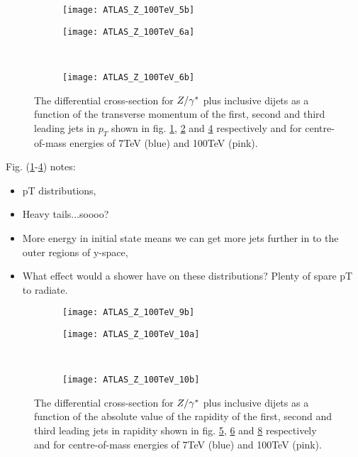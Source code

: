 	\begin{figure}[h]
		\centering
		\begin{subfigure}[b]{0.48\textwidth}
			\texttt{[image: ATLAS\_Z\_100TeV\_5b]}
			\caption{}
			\label{fig:100tev_5b}
		\end{subfigure}

		\begin{subfigure}[b]{0.48\textwidth}
			\texttt{[image: ATLAS\_Z\_100TeV\_6a]}
			\caption{}
			\label{fig:100tev_6a}
		\end{subfigure}
		~
		\begin{subfigure}[b]{0.48\textwidth}
			\texttt{[image: ATLAS\_Z\_100TeV\_6b]}
			\caption{}
			\label{fig:100tev_6b}
		\end{subfigure}
		\caption{The differential cross-section for $Z/\gamma^*$ plus inclusive dijets as a function of the transverse momentum
		         of the first, second and third leading jets in $p_T$ shown in fig. \ref{fig:100tev_5b}, \ref{fig:100tev_6a}
		         and \ref{fig:100tev_6b} respectively and for centre-of-mass energies of 7TeV (blue) and 100TeV (pink).}
	\end{figure}

	Fig. (\ref{fig:100tev_5b}-\ref{fig:100tev_6b}) notes:

	\begin{itemize}
		\item pT distributions,
		\item Heavy tails...soooo?
		\item More energy in initial state means we can get more jets further in to the outer regions of y-space,
		\item What effect would a shower have on these distributions?  Plenty of spare pT to radiate.
	\end{itemize}

	\begin{figure}[h]
		\centering
		\begin{subfigure}[b]{0.48\textwidth}
			\texttt{[image: ATLAS\_Z\_100TeV\_9b]}
			\caption{}
			\label{fig:100tev_9b}
		\end{subfigure}

		\begin{subfigure}[b]{0.48\textwidth}
			\texttt{[image: ATLAS\_Z\_100TeV\_10a]}
			\caption{}
			\label{fig:100tev_10a}
		\end{subfigure}
		~
		\begin{subfigure}[b]{0.48\textwidth}
			\texttt{[image: ATLAS\_Z\_100TeV\_10b]}
			\caption{}
			\label{fig:100tev_10b}
		\end{subfigure}
		\caption{The differential cross-section for $Z/\gamma^*$ plus inclusive dijets as a function of the absolute value of the rapidity
		         of the first, second and third leading jets in rapidity shown in fig. \ref{fig:100tev_9b}, \ref{fig:100tev_10a}
		         and \ref{fig:100tev_10b} respectively and for centre-of-mass energies of 7TeV (blue) and 100TeV (pink).}
	\end{figure}

